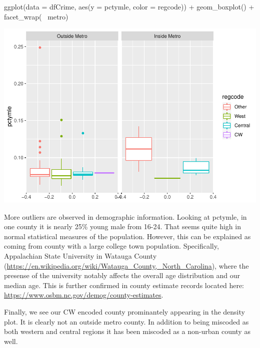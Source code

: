 \documentclass[]{article}
\newenvironment{Shaded}{}{}
\newcommand{\DataTypeTok}[1]{#1}
\newcommand{\KeywordTok}[1]{\textcolor[rgb]{0.00,0.00,1.00}{#1}}
\newcommand{\NormalTok}[1]{#1}
\newcommand{\OperatorTok}[1]{#1}
\newcommand{\StringTok}[1]{\textcolor[rgb]{0.00,0.50,0.50}{#1}}
\begin{document}
\begin{Shaded}
\begin{Highlighting}[]
\KeywordTok{ggplot}\NormalTok{(}\DataTypeTok{data =}\NormalTok{ dfCrime, }\KeywordTok{aes}\NormalTok{(}\DataTypeTok{y =}\NormalTok{ pctymle, }\DataTypeTok{color =}\NormalTok{ regcode)) }\OperatorTok{+}
\StringTok{      }\KeywordTok{geom_boxplot}\NormalTok{() }\OperatorTok{+}\StringTok{ }\KeywordTok{facet_wrap}\NormalTok{(}\OperatorTok{~}\StringTok{ }\NormalTok{metro)}
\end{Highlighting}
\end{Shaded}

\includegraphics{Bagnard_Gaustad_Hartman_Leung_Lab_3_files/figure-latex/unnamed-chunk-27-3.pdf}

More outliers are observed in demographic information. Looking at
pctymle, in one county it is nearly 25\% young male from 16-24. That
seems quite high in normal statistical measures of the population.
However, this can be explained as coming from county with a large
college town population. Specifically, Appalachian State University in
Watauga County
(\url{https://en.wikipedia.org/wiki/Watauga_County,_North_Carolina}),
where the presense of the university notably affects the overall age
distribution and our median age. This is further confirmed in county
estimate records located here:
\url{https://www.osbm.nc.gov/demog/county-estimates}.

Finally, we see our CW encoded county prominantely appearing in the
density plot. It is clearly not an outside metro county. In addition to
being miscoded as both western and central regions it has been miscoded
as a non-urban county as well.
\end{document}
